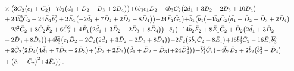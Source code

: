 \documentclass[10pt]{amsart}
\theoremstyle{definition}
\theoremstyle{corollary}
\theoremstyle{remark}
\theoremstyle{conclusion}
\begin{document}
\begin{align}
		& \hskip 0.7cm \times \bigl(3 \bar{C}_2 \bigl(\bar{c}_1+\bar{C}_2\bigl)-7 \bar{b}_2 \bigl(\bar{d}_1+\bar{D}_2-\bar{D}_3+2 \bar{D}_4\bigl)\bigl)+6 \bar{b}_3 \bar{c}_1 \bar{D}_2-4 \bar{b}_3 \bar{C}_2 \bigl(2 \bar{d}_1+3 \bar{D}_2-2 \bar{D}_3+10 \bar{D}_4\bigl) \nonumber\\
		& \hskip 0.7cm +24 \bar{b}_3^3 \bar{C}_2-24 \bar{E}_1 \bar{b}_3^2+2 \bar{E}_1 \bigl(-2 \bar{d}_1+7 \bar{D}_2+2 \bar{D}_3-8 \bar{D}_4\bigl)\bigl)+24 \bar{F}_1 \bar{G}_1\bigl)+\bar{b}_1 \bigl(\bar{b}_3 \bigl(-4 \bar{b}_2 \bar{C}_2 \bigl(\bar{d}_1+\bar{D}_2-\bar{D}_3+2 \bar{D}_4\bigl) \nonumber\\
		& \hskip 0.7cm -2 \bar{c}_1^2 \bar{C}_2+8 \bar{C}_2 \bar{F}_2+6 \bar{C}_2^3+4 \bar{E}_1 \bigl(2 \bar{d}_1+3 \bar{D}_2-2 \bar{D}_3+8 \bar{D}_4\bigl)\bigl)-\bar{c}_1 \bigl(-14 \bar{b}_2 \bar{F}_2+8 \bar{E}_1 \bar{C}_2+\bar{D}_2 \bigl(2 \bar{d}_1+3 \bar{D}_2 \nonumber\\
		& \hskip 0.7cm -2 \bar{D}_3+8 \bar{D}_4\bigl)\bigl)+4 \bar{b}_3^2 \bigl(\bar{c}_1 \bar{D}_2-2 \bar{C}_2 \bigl(2 \bar{d}_1+3 \bar{D}_2-2 \bar{D}_3+8 \bar{D}_4\bigl)\bigl)-2 \bar{F}_2 \bigl(5 \bar{b}_2 \bar{C}_2+8 \bar{E}_1\bigl)+16 \bar{b}_3^4 \bar{C}_2-16 \bar{E}_1 \bar{b}_3^3  \nonumber\\
		& \hskip 0.7cm +2 \bar{C}_2 \bigl(2 \bar{D}_4 \bigl(4 \bar{d}_1+7 \bar{D}_2-2 \bar{D}_3\bigl)+\bigl(\bar{D}_2+2 \bar{D}_3\bigl) \bigl(\bar{d}_1+\bar{D}_2-\bar{D}_3\bigl)+24 \bar{D}_4^2\bigl)\bigl)+\bar{b}_1^2 \bar{C}_2 \bigl(-4 \bar{b}_3 \bar{D}_3+2 \bar{b}_2 \bigl(\bar{b}_3^2-\bar{D}_4\bigl) \nonumber\\
		& \hskip 0.7cm +\bigl(\bar{c}_1-\bar{C}_2\bigl)^2+4 \bar{F}_4\bigl)\bigl) \, .
  \end{align} 
\end{document}

